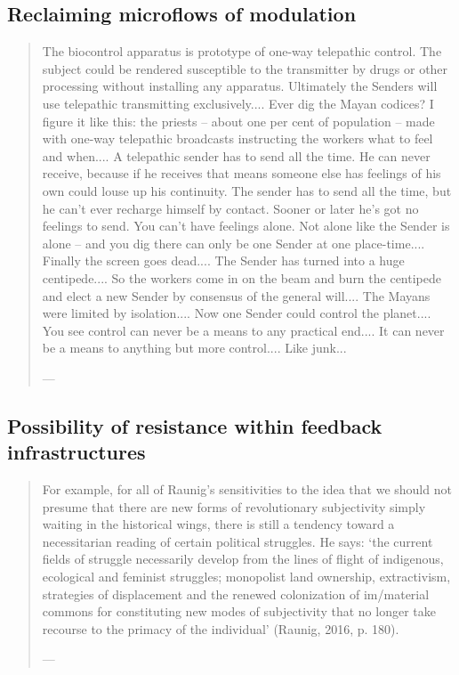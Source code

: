 \subsection{Reclaiming microflows of modulation}

\begin{quote}
	The biocontrol apparatus is prototype of one-way telepathic control. The subject could be rendered susceptible to the transmitter by drugs or other processing without installing any apparatus. Ultimately the Senders will use telepathic transmitting exclusively.... Ever dig the Mayan codices? I figure it like this: the priests -- about one per cent of population -- made with one-way telepathic broadcasts instructing the workers what to feel and when.... A telepathic sender has to send all the time. He can never receive, because if he receives that means someone else has feelings of his own could louse up his continuity. The sender has to send all the time, but he can't ever recharge himself by contact. Sooner or later he's got no feelings to send. You can't have feelings alone. Not alone like the Sender is alone -- and you dig there can only be one Sender at one place-time.... Finally the screen goes dead.... The Sender has turned into a huge centipede.... So the workers come in on the beam and burn the centipede and elect a new Sender by consensus of the general will.... The Mayans were limited by isolation.... Now one Sender could control the planet.... You see control can never be a means to any practical end.... It can never be a means to anything but more control.... Like junk...

	— \cite[81]{burroughs1992}
\end{quote}



\subsection{Possibility of resistance within feedback infrastructures}

\begin{quote}
	For example, for all of Raunig’s sensitivities to the idea that we should  not presume that there are new forms of revolutionary subjectivity simply waiting  in the historical wings, there is still a tendency toward a necessitarian reading of  certain political struggles. He says: ‘the current fields of struggle necessarily  develop from the lines of flight of indigenous, ecological and feminist struggles;  monopolist land ownership, extractivism, strategies of displacement and the  renewed colonization of im/material commons for constituting new modes of  subjectivity that no longer take recourse to the primacy of the individual’ (Raunig,  2016, p. 180).

	— \cite[25]{mackenzie2021}
\end{quote}


